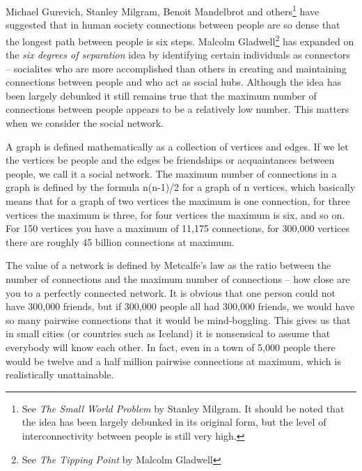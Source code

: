 Michael Gurevich, Stanley Milgram, Benoit Mandelbrot and others\footnote{See
\textit{The Small World Problem} by Stanley Milgram. It should be noted that 
the idea has been largely debunked in its original form, but the level of
interconnectivity between people is still very high.} have suggested that in
human society connections between people are so dense that the longest path
between people is six steps. Malcolm Gladwell\footnote{See \textit{The Tipping
Point} by Malcolm Gladwell} has expanded on the \textit{six degrees of
separation} idea by identifying certain individuals as connectors – socialites
who are more accomplished than others in creating and maintaining connections
between people and who act as social hubs. Although the idea has been largely
debunked it still remains true that the maximum number of connections between
people appears to be a relatively low number. This matters when we consider the
social network.

A graph is def\hbox{}ined mathematically as a collection of vertices and edges.
If we let the vertices be people and the edges be friendships or acquaintances
between people, we call it a social network. The maximum number of connections
in a graph is def\hbox{}ined by the formula n(n-1)/2 for a graph of n vertices,
which basically means that for a graph of two vertices the maximum is one
connection, for three vertices the maximum is three, for four vertices the
maximum is six, and so on. For 150 vertices you have a maximum of 11,175
connections, for 300,000 vertices there are roughly 45 billion connections at
maximum.

The value of a network is def\hbox{}ined by Metcalfe's law as the ratio between
the number of connections and the maximum number of connections – how close are
you to a perfectly connected network. It is obvious that one person could not
have 300,000 friends, but if 300,000 people all had 300,000 friends, we would
have so many pairwise connections that it would be mind-boggling. This gives us
that in small cities (or countries such as Iceland) it is nonsensical to assume
that everybody will know each other. In fact, even in a town of 5,000 people
there would be twelve and a half million pairwise connections at maximum, which
is realistically unattainable.

